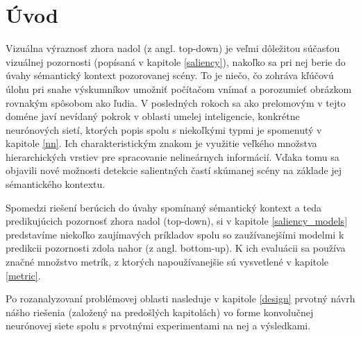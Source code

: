 \newpage
\null
\thispagestyle{empty}
\newpage
\section{Úvod}
\setcounter{page}{1}

Vizuálna výraznosť zhora nadol (z angl. top-down) je veľmi dôležitou súčasťou vizuálnej pozornosti (popísaná v kapitole \ref{saliency}), nakoľko sa pri nej berie do úvahy sémantický kontext pozorovanej scény. To je niečo, čo zohráva kľúčovú úlohu pri snahe výskumníkov umožniť počítačom vnímať a porozumieť obrázkom rovnakým spôsobom ako ľudia. V posledných rokoch sa ako prelomovým v tejto doméne javí nevídaný pokrok v oblasti umelej inteligencie, konkrétne neurónových sietí, ktorých popis spolu s niekoľkými typmi je spomenutý v kapitole \ref{nn}. Ich charakteristickým znakom je využitie veľkého množstva hierarchických vrstiev pre spracovanie nelineárnych informácií. Vďaka tomu sa objavili nové možnosti detekcie salientných častí skúmanej scény na základe jej sémantického kontextu.

Spomedzi riešení berúcich do úvahy spomínaný sémantický kontext a teda predikujúcich pozornosť zhora nadol (top-down), si v kapitole \ref{saliency_models} predstavíme niekoľko zaujímavých príkladov spolu so zaužívanejšími modelmi k predikcii pozornosti zdola nahor (z angl. bottom-up). K ich evaluácii sa používa značné množstvo metrík, z ktorých napoužívanejšie sú vysvetlené v kapitole \ref{metric}.

Po rozanalyzovaní problémovej oblasti nasleduje v kapitole \ref{design} prvotný návrh nášho riešenia (založený na predošlých kapitolách) vo forme konvolučnej neurónovej siete spolu  s prvotnými experimentami na nej a výsledkami.

\newpage
\null
\thispagestyle{empty}



